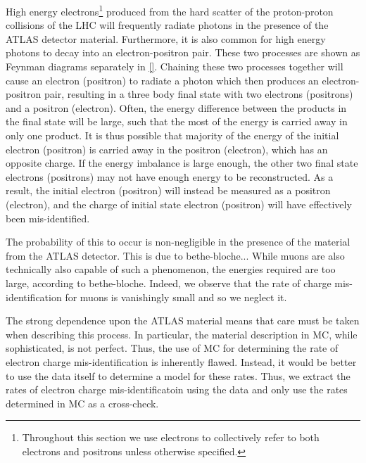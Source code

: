 

High energy electrons\footnote{Throughout this section we use 
electrons to collectively refer to both electrons and positrons
unless otherwise specified.} produced from the 
hard scatter of the proton-proton
collisions of the LHC
will frequently radiate photons in the presence of the ATLAS
detector material. Furthermore, it is also common %
for high energy photons to decay into an electron-positron pair.
These two processes are shown as Feynman diagrams 
separately in \fig\ref{}.
Chaining these two processes together will cause 
an electron (positron) to radiate a photon which then produces an
electron-positron pair, resulting in a three body final state with
two electrons (positrons) and a positron (electron).
Often, the energy difference between the products in the final state will
be large, such that the most of the energy is carried away in only one
product.  It is thus possible that majority of the energy of the initial
electron (positron) is carried away in the positron (electron), which
has an opposite charge.  If the energy imbalance is large enough,
the other two final state electrons (positrons) may not have enough
energy to be reconstructed. As a result, the initial electron
(positron) will instead be measured as a positron (electron), and the 
charge of initial state electron (positron) will have effectively 
been mis-identified. 


The probability of this to occur is non-negligible in the presence of the material 
from the ATLAS detector. This is due to bethe-bloche...
While muons are also technically also capable of such a phenomenon, the 
energies required are too large, according to bethe-bloche.
Indeed, we observe that the rate of charge mis-identification for muons
is vanishingly small and so we neglect it. %

The strong dependence upon the ATLAS material means that care must be
taken when describing this process. In particular, the material 
description in MC, while sophisticated, is not perfect. Thus, the use of MC
for determining the rate of electron charge mis-identification is inherently
flawed. Instead, it would be better to use the data itself to determine
a model for these rates. 
Thus, we extract the rates of electron charge 
mis-identificatoin using the data and only use the rates determined
in MC as a cross-check.

